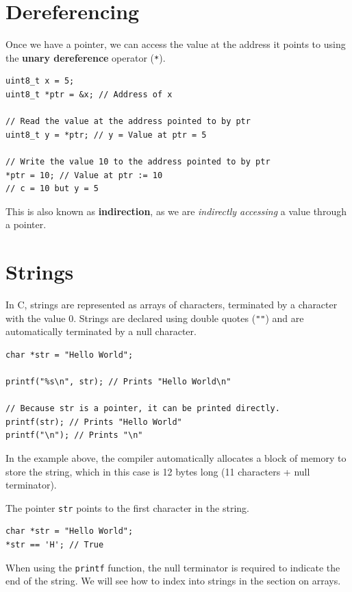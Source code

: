 \documentclass[a4paper]{report}
\begin{document}
\section{Dereferencing}
Once we have a pointer, we can access the value at the address it points to using the
\textbf{unary dereference} operator (\texttt{*}).
\begin{verbatim}
uint8_t x = 5;
uint8_t *ptr = &x; // Address of x

// Read the value at the address pointed to by ptr
uint8_t y = *ptr; // y = Value at ptr = 5

// Write the value 10 to the address pointed to by ptr
*ptr = 10; // Value at ptr := 10
// c = 10 but y = 5
\end{verbatim}
This is also known as \textbf{indirection}, as we are \textit{indirectly accessing} a value through a pointer.
\section{Strings}
In C, strings are represented as arrays of characters, terminated by a character with the value 0.
Strings are declared using double quotes (\texttt{""}) and are automatically terminated by a null character. %
\begin{verbatim}
char *str = "Hello World";

printf("%s\n", str); // Prints "Hello World\n"

// Because str is a pointer, it can be printed directly.
printf(str); // Prints "Hello World"
printf("\n"); // Prints "\n"
\end{verbatim}
In the example above, the compiler automatically allocates a block of memory to store the string,
which in this case is 12 bytes long (11 characters + null terminator).

The pointer \texttt{str} points to the first character in the string.
\begin{verbatim}
char *str = "Hello World";
*str == 'H'; // True
\end{verbatim}
When using the \texttt{printf} function, the null terminator is required to indicate the end of the string.
We will see how to index into strings in the section on arrays.
\end{document}

